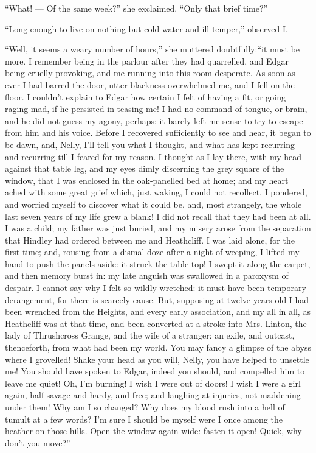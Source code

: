 \par “What! — Of the same week?” she exclaimed. “Only that brief time?”
\par “Long enough to live on nothing but cold water and ill-temper,” observed I.
\par “Well, it seems a weary number of hours,” she muttered doubtfully:“it must be more. I remember being in the parlour after they had quarrelled, and Edgar being cruelly provoking, and me running into this room desperate. As soon as ever I had barred the door, utter blackness overwhelmed me, and I fell on the floor. I couldn't explain to Edgar how certain I felt of having a fit, or going raging mad, if he persisted in teasing me! I had no command of tongue, or brain, and he did not guess my agony, perhaps: it barely left me sense to try to escape from him and his voice. Before I recovered sufficiently to see and hear, it began to be dawn, and, Nelly, I'll tell you what I thought, and what has kept recurring and recurring till I feared for my reason. I thought as I lay there, with my head against that table leg, and my eyes dimly discerning the grey square of the window, that I was enclosed in the oak-panelled bed at home; and my heart ached with some great grief which, just waking, I could not recollect. I pondered, and worried myself to discover what it could be, and, most strangely, the whole last seven years of my life grew a blank! I did not recall that they had been at all. I was a child; my father was just buried, and my misery arose from the separation that Hindley had ordered between me and Heathcliff. I was laid alone, for the first time; and, rousing from a dismal doze after a night of weeping, I lifted my hand to push the panels aside: it struck the table top! I swept it along the carpet, and then memory burst in: my late anguish was swallowed in a paroxysm of despair. I cannot say why I felt so wildly wretched: it must have been temporary derangement, for there is scarcely cause. But, supposing at twelve years old I had been wrenched from the Heights, and every early association, and my all in all, as Heathcliff was at that time, and been converted at a stroke into Mrs. Linton, the lady of Thrushcross Grange, and the wife of a stranger: an exile, and outcast, thenceforth, from what had been my world. You may fancy a glimpse of the abyss where I grovelled! Shake your head as you will, Nelly, you have helped to unsettle me! You should have spoken to Edgar, indeed you should, and compelled him to leave me quiet! Oh, I'm burning! I wish I were out of doors! I wish I were a girl again, half savage and hardy, and free; and laughing at injuries, not maddening under them! Why am I so changed? Why does my blood rush into a hell of tumult at a few words? I'm sure I should be myself were I once among the heather on those hills. Open the window again wide: fasten it open! Quick, why don't you move?”
